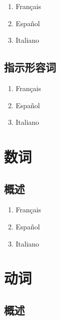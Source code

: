 \documentclass[UTF8,a4paper,titlepage,10pt]{report}
\begin{document}
\begin{enumerate}
\item Français
\label{sec:orgb2ff729}

\item Español
\label{sec:orgd252f73}

\item Italiano
\label{sec:orgdc08af0}
\end{enumerate}

\section{指示形容词}
\label{sec:orgbce2227}

\begin{enumerate}
\item Français
\label{sec:org3f858e4}

\item Español
\label{sec:orgbb0a579}

\item Italiano
\label{sec:org1cf7872}
\end{enumerate}

\chapter{数词}
\label{sec:orgb8aae48}

\section{概述}
\label{sec:org0e04999}

\begin{enumerate}
\item Français
\label{sec:orge00d5c3}

\item Español
\label{sec:org06deffe}

\item Italiano
\label{sec:org1dce840}
\end{enumerate}

\chapter{动词}
\label{sec:org8f63165}

\section{概述}
\label{sec:orgfdc240f}
\end{document}
